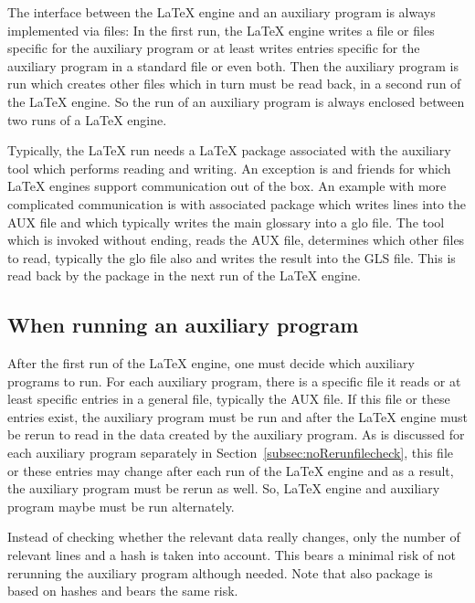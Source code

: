 The interface between the \LaTeX{} engine and an auxiliary program 
is always implemented via files: 
In the first run, the \LaTeX{} engine writes a file or files 
specific for the auxiliary program 
or at least writes entries specific for the auxiliary program 
in a standard file or even both. 
Then the auxiliary program is run which creates other files 
which in turn must be read back, in a second run of the \LaTeX{} engine. 
So the run of an auxiliary program 
is always enclosed between two runs of a \LaTeX{} engine. 

Typically, the \LaTeX{} run needs a \LaTeX{} package 
associated with the auxiliary tool 
which performs reading and writing. 
An exception is  and friends 
for which \LaTeX{} engines support communication out of the box. 
An example with more complicated communication 
is  with associated package  
which writes lines into the AUX file 
and which typically writes the main glossary into a \gls{glo} file. 
The tool  which is invoked without ending, 
reads the AUX file, determines which other files to read, 
typically the \gls{glo} file also 
and writes the result into the GLS file. 
This is read back by the package  
in the next run of the \LaTeX{} engine. 


\subsection{When running an auxiliary program}\label{subsec:firstRunAux}

After the first run of the \LaTeX{} engine, 
one must decide which auxiliary programs to run. 
For each auxiliary program, there is a specific file it reads 
or at least specific entries in a general file, typically the AUX file. 
If this file or these entries exist, the auxiliary program must be run 
and after the \LaTeX{} engine must be rerun 
to read in the data created by the auxiliary program. 
As is discussed for each auxiliary program separately 
in Section~\ref{subsec:noRerunfilecheck}, 
this file or these entries may change after each run of the \LaTeX{} engine 
and as a result, the auxiliary program must be rerun as well. 
So, \LaTeX{} engine and auxiliary program maybe must be run alternately. 

Instead of checking whether the relevant data really changes, 
only the number of relevant lines and a hash is taken into account. 
This bears a minimal risk of not rerunning the auxiliary program although needed. 
Note that also package  is based on hashes and bears the same risk. 

